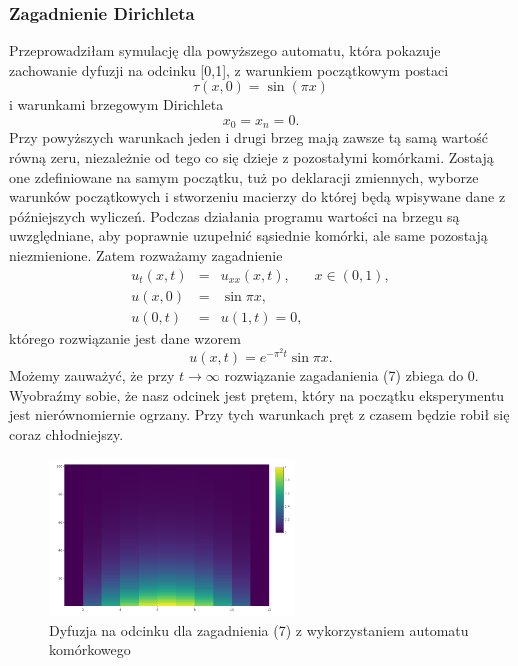 \documentclass[a4paper,12pt]{article}
\begin{document}
\subsubsection{Zagadnienie Dirichleta}
Przeprowadziłam symulację dla powyższego automatu, która pokazuje zachowanie dyfuzji na odcinku [0,1], z warunkiem początkowym postaci $$\tau(x,0)=\sin(\pi x)$$ i warunkami brzegowym Dirichleta $$x_0=x_n=0.$$ 
Przy powyższych warunkach jeden i drugi brzeg mają zawsze tą samą wartość równą zeru, niezależnie od tego co się dzieje z pozostałymi komórkami. Zostają one zdefiniowane na samym początku, tuż po deklaracji zmiennych, wyborze warunków początkowych i stworzeniu macierzy do której będą wpisywane dane z późniejszych wyliczeń. Podczas działania programu wartości na brzegu są uwzględniane, aby poprawnie uzupełnić sąsiednie komórki, ale same pozostają niezmienione. 
Zatem rozważamy zagadnienie 
\begin{equation}
    \begin{array}{llll}
    u_t(x,t)&=&u_{xx}(x,t),&x\in(0,1),\\
    u(x,0)&=&\sin\pi x,\\
    u(0,t)&=&u(1,t)=0, \end{array}
\end{equation}
którego rozwiązanie jest dane wzorem $$u(x,t) = e^{-\pi^2t}\sin\pi x.$$
Możemy zauważyć, że przy $t\rightarrow\infty$ rozwiązanie zagadanienia (7) zbiega do 0.
Wyobraźmy sobie, że nasz odcinek jest prętem, który na początku eksperymentu jest nierównomiernie ogrzany. Przy tych warunkach pręt z czasem będzie robił się coraz chłodniejszy.
\begin{figure}[!htb]
    \centering
    \includegraphics[width=6.5cm]{dyfuzaj.png}
    \caption{Dyfuzja na odcinku dla zagadnienia (7) z wykorzystaniem automatu komórkowego}
    \label{fig:my_label}
\end{figure}
\newpage
\end{document}
